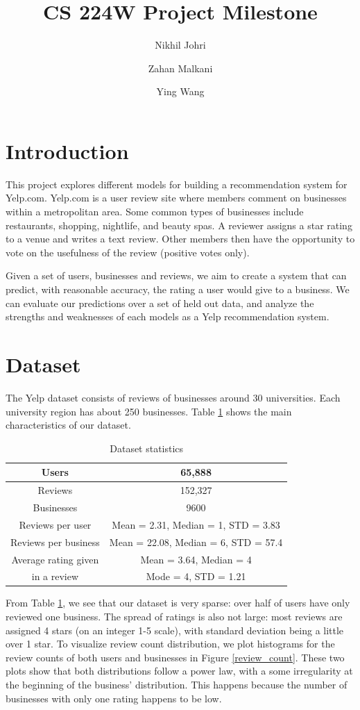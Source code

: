 \documentclass[10pt, letterpaper]{article}
\title{CS 224W Project Milestone}
\author{Nikhil Johri
  \and Zahan Malkani
  \and Ying Wang}
\date{}
\begin{document}
\maketitle

\section{Introduction}
This project explores different models for building a recommendation system 
for Yelp.com. Yelp.com is a user review site where members comment on 
businesses within a metropolitan area. Some common types of businesses include 
restaurants, shopping, nightlife, and beauty spas. A reviewer assigns a 
star rating to a venue and writes a text review. Other members then have the 
opportunity to vote on the usefulness of the review (positive votes only).

Given a set of users, businesses and reviews, we aim to create a system that 
can predict, with reasonable accuracy, the rating a user would give 
to a business. We can evaluate our predictions over a set of held out data, 
and analyze the strengths and weaknesses of each models as a Yelp
recommendation system.


\section{Dataset}
The Yelp dataset consists of reviews of businesses around 30 universities. 
Each university region has about 250 businesses. Table \ref{stats} shows the 
main characteristics of our dataset. 

\begin{table}[htb]
\centering
\begin{tabular}{|c|c|}
\hline
Users &65,888 \tabularnewline \hline
Reviews &152,327 \tabularnewline \hline
Businesses &9600 \tabularnewline \hline
Reviews per user &Mean = 2.31, Median = 1, STD = 3.83 
\tabularnewline \hline
Reviews per business &Mean = 22.08, Median = 6, STD = 57.4 
\tabularnewline \hline
Average rating given &Mean = 3.64, Median = 4 \tabularnewline
in a review &Mode = 4, STD = 1.21 
\tabularnewline \hline

\end{tabular}
\caption{ Dataset statistics }
\label{stats}
\end{table}

From Table \ref{stats}, we see that our dataset is very sparse: over half of 
users have only reviewed one business. The spread of ratings is also not large: 
most reviews are assigned 4 stars (on an integer 1-5 scale), with standard 
deviation being a little over 1 star. To visualize review count distribution, 
we plot histograms for the review counts of both users and businesses in 
Figure \ref{review_count}. These two plots show that both distributions follow 
a power law, with a some irregularity at the beginning of the business' 
distribution. This happens because the number of businesses with only one 
rating happens to be low.
\end{document}
